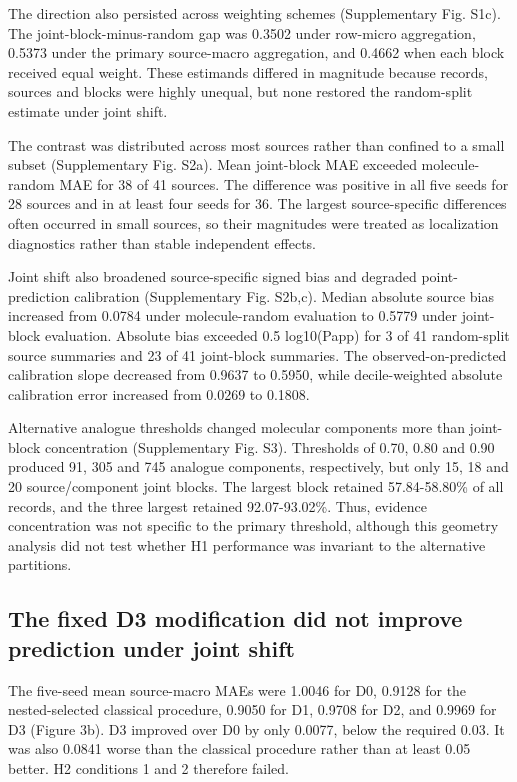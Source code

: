\documentclass[referee,lineno,pdflatex,Numbered,sn-basic]{sn-jnl}
\begin{document}
The direction also persisted across weighting schemes (Supplementary Fig. S1c). The joint-block-minus-random gap was 0.3502 under row-micro aggregation, 0.5373 under the primary source-macro aggregation, and 0.4662 when each block received equal weight. These estimands differed in magnitude because records, sources and blocks were highly unequal, but none restored the random-split estimate under joint shift.

The contrast was distributed across most sources rather than confined to a small subset (Supplementary Fig. S2a). Mean joint-block MAE exceeded molecule-random MAE for 38 of 41 sources. The difference was positive in all five seeds for 28 sources and in at least four seeds for 36. The largest source-specific differences often occurred in small sources, so their magnitudes were treated as localization diagnostics rather than stable independent effects.

Joint shift also broadened source-specific signed bias and degraded point-prediction calibration (Supplementary Fig. S2b,c). Median absolute source bias increased from 0.0784 under molecule-random evaluation to 0.5779 under joint-block evaluation. Absolute bias exceeded 0.5 log10(Papp) for 3 of 41 random-split source summaries and 23 of 41 joint-block summaries. The observed-on-predicted calibration slope decreased from 0.9637 to 0.5950, while decile-weighted absolute calibration error increased from 0.0269 to 0.1808.

Alternative analogue thresholds changed molecular components more than joint-block concentration (Supplementary Fig. S3). Thresholds of 0.70, 0.80 and 0.90 produced 91, 305 and 745 analogue components, respectively, but only 15, 18 and 20 source/component joint blocks. The largest block retained 57.84-58.80\% of all records, and the three largest retained 92.07-93.02\%. Thus, evidence concentration was not specific to the primary threshold, although this geometry analysis did not test whether H1 performance was invariant to the alternative partitions.

\subsection{The fixed D3 modification did not improve prediction under joint shift}

The five-seed mean source-macro MAEs were 1.0046 for D0, 0.9128 for the nested-selected classical procedure, 0.9050 for D1, 0.9708 for D2, and 0.9969 for D3 (Figure 3b). D3 improved over D0 by only 0.0077, below the required 0.03. It was also 0.0841 worse than the classical procedure rather than at least 0.05 better. H2 conditions 1 and 2 therefore failed.
\end{document}

